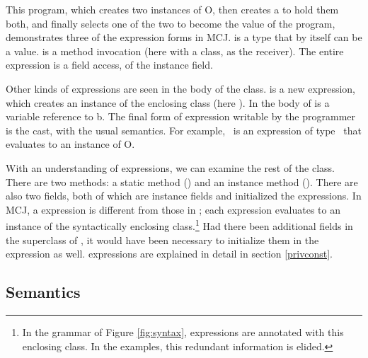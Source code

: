 \documentclass[nocopyrightspace,10pt]{acm-sigplan}
\begin{document}
This program, which creates two instances of {\txt O}, then creates a
{} to hold them both, and finally selects one of the two to
become the value of the program, demonstrates three of the expression
forms in MCJ.  {} is a type that by itself can be a
value.  {} is a method invocation (here with a class, as
the receiver).  The entire expression is a field access, of the
{} instance field.

Other kinds of expressions are seen in the body of the {}
class.  {} is a new expression, which creates an
instance of the enclosing class (here {}).  In the body of
{} is a variable reference to {\txt b}.  The final form of
expression writable by the programmer is the cast, with the usual
semantics. For example, {}\ is an expression of
type \Object\ that evaluates to an instance of {\txt O}.

With an understanding of expressions, we can examine the rest of the
{} class.  There are two methods: a static method
({}) and an instance method ({}).  There are
also two fields, both of which are instance fields and initialized the
{} expressions. In MCJ, a {} expression is different
from those in \FGJ; each {} expression evaluates to an
instance of the syntactically enclosing class.\footnote{In the grammar
of Figure \ref{fig:syntax}, {} expressions are annotated with
this enclosing class.  In the examples, this redundant information is
elided.}  Had there been additional fields in the superclass of
{}, it would have been necessary to initialize them in the
{} expression as well. {} expressions are explained
in detail in section \ref{privconst}.


\subsection{Semantics}
\label{formalsem}
\end{document}
